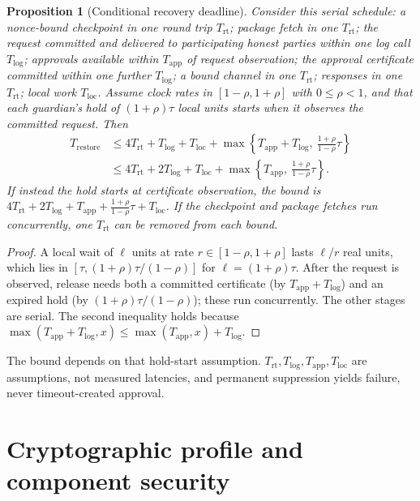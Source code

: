 \documentclass[pdflatex,sn-mathphys-num]{sn-jnl}%
\theoremstyle{plain}
\newtheorem{proposition}[theorem]{Proposition}
\theoremstyle{definition}
\begin{document}
\begin{proposition}[Conditional recovery deadline]\label{prop:deadline}
Consider this serial schedule: a nonce-bound checkpoint in one round trip $T_{\mathrm{rt}}$; package fetch in one $T_{\mathrm{rt}}$; the request committed and delivered to participating honest parties within one log call $T_{\mathrm{log}}$; approvals available within $T_{\mathrm{app}}$ of request observation; the approval certificate committed within one further $T_{\mathrm{log}}$; a bound channel in one $T_{\mathrm{rt}}$; responses in one $T_{\mathrm{rt}}$; local work $T_{\mathrm{loc}}$. Assume clock rates in $[1-\rho,1+\rho]$ with $0\le\rho<1$, and that each guardian's hold of $(1+\rho)\tau$ local units starts when it observes the committed request. Then
\begin{equation}\label{eq:deadline}
\begin{split}
 T_{\mathrm{restore}}&\le4T_{\mathrm{rt}}+T_{\mathrm{log}}+T_{\mathrm{loc}}+\max\!\left\{T_{\mathrm{app}}+T_{\mathrm{log}},\ \tfrac{1+\rho}{1-\rho}\tau\right\}\\
 &\le4T_{\mathrm{rt}}+2T_{\mathrm{log}}+T_{\mathrm{loc}}+\max\!\left\{T_{\mathrm{app}},\ \tfrac{1+\rho}{1-\rho}\tau\right\}.
\end{split}
\end{equation}
If instead the hold starts at certificate observation, the bound is $4T_{\mathrm{rt}}+2T_{\mathrm{log}}+T_{\mathrm{app}}+\frac{1+\rho}{1-\rho}\tau+T_{\mathrm{loc}}$. If the checkpoint and package fetches run concurrently, one $T_{\mathrm{rt}}$ can be removed from each bound.
\end{proposition}
\begin{proof}
A local wait of $\ell$ units at rate $r\in[1-\rho,1+\rho]$ lasts $\ell/r$ real units, which lies in $[\tau,(1+\rho)\tau/(1-\rho)]$ for $\ell=(1+\rho)\tau$. After the request is observed, release needs both a committed certificate (by $T_{\mathrm{app}}+T_{\mathrm{log}}$) and an expired hold (by $(1+\rho)\tau/(1-\rho)$); these run concurrently. The other stages are serial. The second inequality holds because $\max(T_{\mathrm{app}}+T_{\mathrm{log}},x)\le\max(T_{\mathrm{app}},x)+T_{\mathrm{log}}$.
\end{proof}

The bound depends on that hold-start assumption. $T_{\mathrm{rt}},T_{\mathrm{log}},T_{\mathrm{app}},T_{\mathrm{loc}}$ are assumptions, not measured latencies, and permanent suppression yields failure, never timeout-created approval.


\section{Cryptographic profile and component security}\label{sec:crypto}
\end{document}
